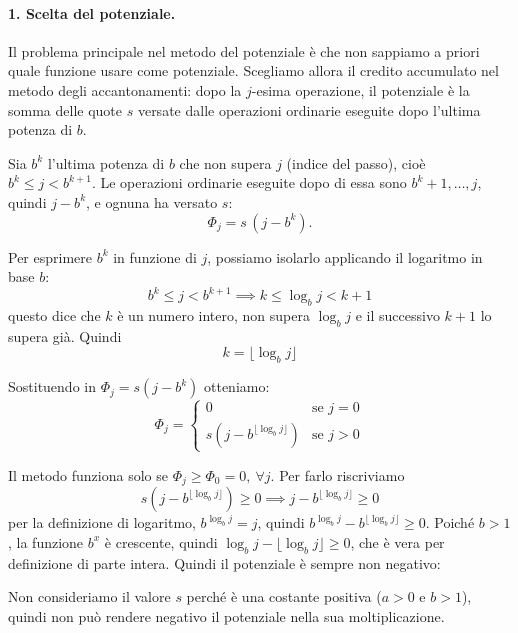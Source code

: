 \paragraph{1. Scelta del potenziale.}
Il problema principale nel metodo del potenziale è che non sappiamo a priori quale funzione usare come potenziale. Scegliamo allora il credito accumulato nel metodo degli accantonamenti: dopo la $j$-esima operazione, il potenziale è la somma delle quote $s$ versate dalle operazioni ordinarie eseguite dopo l'ultima potenza di $b$.

Sia $b^k$ l'ultima potenza di $b$ che non supera $j$ (indice del passo), cioè $b^k \le j < b^{k+1}$. Le operazioni ordinarie eseguite dopo di essa sono $b^k + 1, \dots, j$, quindi
$j - b^k$, e ognuna ha versato $s$:
\[
\Phi_j = s\,(j - b^k).
\]

Per esprimere $b^k$ in funzione di $j$, possiamo isolarlo applicando il logaritmo in base $b$:
\[
b^k \le j < b^{k+1} \implies k \le \log_b j < k+1
\]
questo dice che $k$ è un numero intero, non supera $\log_b j$ e il successivo $k+1$ lo supera già. Quindi
\[
k = \lfloor \log_b j \rfloor
\]

\noindent
Sostituendo in $\Phi_j = s(j - b^k)$ otteniamo:
\[
\Phi_j = 
\begin{cases}
    0 & \text{se } j = 0 \\
    s(j-b^{\lfloor \log_b j \rfloor}) & \text{se } j > 0
\end{cases}
\]

Il metodo funziona solo se $\Phi_j \ge \Phi_0 = 0, \ \forall j$. Per farlo riscriviamo
\[
s(j-b^{\lfloor \log_b j \rfloor}) \ge 0 \implies j - b^{\lfloor \log_b j \rfloor} \ge 0
\]
per la definizione di logaritmo, $b^{\log_b j} = j$, quindi $b^{\log_b j} - b^{\lfloor \log_b j \rfloor} \ge 0$. Poiché $b > 1$, la funzione $b^x$ è crescente, quindi $\log_b j - \lfloor \log_b j \rfloor \ge 0$, che è vera per definizione di parte intera. Quindi il potenziale è sempre non negativo:

\begin{osservazione}
    Non consideriamo il valore $s$ perché è una costante positiva ($a > 0$ e $b > 1$), quindi non può rendere negativo il potenziale nella sua moltiplicazione.
\end{osservazione}

